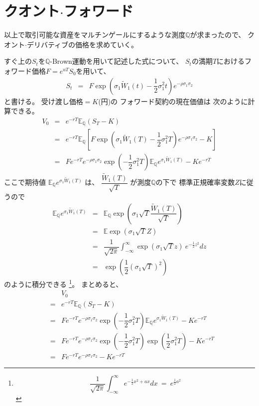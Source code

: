 \documentclass[uplatex,a4j,12pt,dvipdfmx]{jsarticle}
\begin{document}
\section{クオント$\cdot$フォワード}

以上で取引可能な資産をマルチンゲールにするような測度$\mathbb{Q}$が求まったので、
クオント$\cdot$デリバティブの価格を求めていく。

すぐ上の$S_{t}$を$\mathbb{Q}$-Brown運動を用いて記述した式について、
$S_{t}$の満期$T$におけるフォワード価格$F = e^{uT} S_{0}$を用いて、
%
%
\begin{eqnarray*}
	S_{t}
	&=&
	F
	\exp \left( \sigma_{1} \tilde{W}_{1}(t) -
	\dfrac{1}{2} \sigma_{1}^{2}
	t \right)
	e^{- \rho \sigma_{1} \sigma_{2}}
\end{eqnarray*}
%
%
と書ける。
受け渡し価格$=K$(円)の
フォワード契約の現在価値は
次のように計算できる。
%
%
\begin{eqnarray*}
	V_{0}
	&=&
	e^{-rT}
	\mathbb{E}_{\mathbb{Q}}(S_{T}-K)
	\\ &=&
	e^{-rT}
	\mathbb{E}_{\mathbb{Q}}
	\left[
		F
		\exp \left( \sigma_{1} \tilde{W}_{1}(T) -
		\dfrac{1}{2} \sigma_{1}^{2}
		T \right)
		e^{- \rho \sigma_{1} \sigma_{2}}
		-
		K
		\right]
	\\ &=&
	F
	e^{-rT}
	e^{- \rho \sigma_{1} \sigma_{2}}
	\exp \left( -\dfrac{1}{2} \sigma_{1}^{2} T \right)
	\mathbb{E}_{\mathbb{Q}}
	e^{\sigma_{1} \tilde{W}_{1}(T)}
	-
	Ke^{-rT}
\end{eqnarray*}
%
%
ここで期待値
$\mathbb{E}_{\mathbb{Q}}
	e^{\sigma_{1} \tilde{W}_{1}(T)}$
は、
$\dfrac{\tilde{W}_{1}(T)}{\sqrt{T}}$
が測度$\mathbb{Q}$の下で
標準正規確率変数$Z$に従うので
%
%
\begin{eqnarray*}
	\mathbb{E}_{\mathbb{Q}}
	e^{\sigma_{1} \tilde{W}_{1}(T)}
	&=&
	\mathbb{E}_{\mathbb{Q}}
	\exp \left( \sigma_{1} \sqrt{T} \dfrac{\tilde{W}_{1}(T)}{\sqrt{T}} \right)
	\\ &=&
	\mathbb{E}
	\exp \left( \sigma_{1} \sqrt{T} Z \right)
	\\ &=&
	\dfrac{1}{ \sqrt{2 \pi} }
	\int^{\infty}_{-\infty}
	\exp \left( \sigma_{1} \sqrt{T} z \right)
	\
	e^{-\frac{1}{2}z^{2}}
	dz
	\\ &=&
	\exp \left( \dfrac{1}{2} (\sigma_{1} \sqrt{T})^{2} \right)
\end{eqnarray*}
%
%
のように積分できる
\footnote{
	$$
		\dfrac{1}{ \sqrt{2 \pi} }
		\int^{\infty}_{-\infty}
		e^{-\frac{1}{2} x^{2} + ax}
		dx
		\ = \
		e^{\frac{1}{2} a^{2}}
	$$
}。
まとめると、
%
%
\begin{eqnarray*}
	&& V_{0}
	\\ &=&
	e^{-rT}
	\mathbb{E}_{\mathbb{Q}}(S_{T}-K)
	\\ &=&
	F
	e^{-rT}
	e^{- \rho \sigma_{1} \sigma_{2}}
	\exp \left( -\dfrac{1}{2} \sigma_{1}^{2} T \right)
	\mathbb{E}_{\mathbb{Q}}
	e^{\sigma_{1} \tilde{W}_{1}(T)}
	-
	Ke^{-rT}
	\\ &=&
	F
	e^{-rT}
	e^{- \rho \sigma_{1} \sigma_{2}}
	\exp \left( -\dfrac{1}{2} \sigma_{1}^{2} T \right)
	\exp \left(\dfrac{1}{2} \sigma_{1}^{2} T \right)
	-
	Ke^{-rT}
	\\ &=&
	F
	e^{-rT}
	e^{- \rho \sigma_{1} \sigma_{2}}
	-
	Ke^{-rT}
\end{eqnarray*}
%
%
\end{document}
